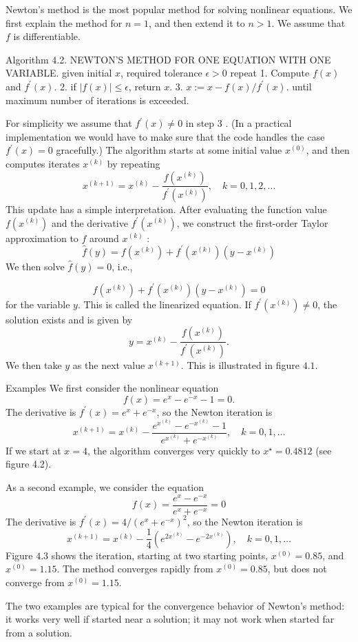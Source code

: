 Newton's method is the most popular method for solving nonlinear equations. We first explain the method for $ n=1 $, and then extend it to $ n>1 $. We assume that $ f $ is differentiable.

Algorithm 4.2. NEWTON'S METHOD FOR ONE EQUATION WITH ONE VARIABLE. given initial $ x $, required tolerance $ \epsilon>0 $ repeat
1. Compute $ f(x) $ and $ f^{\prime}(x) $.
2. if $ |f(x)| \leq \epsilon $, return $ x $.
3. $ x:=x-f(x) / f^{\prime}(x) $.
until maximum number of iterations is exceeded.

For simplicity we assume that $ f^{\prime}(x) \neq 0 $ in step 3 . (In a practical implementation we would have to make sure that the code handles the case $ f^{\prime}(x)=0 $ gracefully.)
The algorithm starts at some initial value $ x^{(0)} $, and then computes iterates $ x^{(k)} $ by repeating
$$
x^{(k+1)}=x^{(k)}-\frac{f\left(x^{(k)}\right)}{f^{\prime}\left(x^{(k)}\right)}, \quad k=0,1,2, \ldots
$$
This update has a simple interpretation. After evaluating the function value $ f\left(x^{(k)}\right) $ and the derivative $ f^{\prime}\left(x^{(k)}\right) $, we construct the first-order Taylor approximation to $ f $ around $ x^{(k)} $ :
$$
\hat{f}(y)=f\left(x^{(k)}\right)+f^{\prime}\left(x^{(k)}\right)\left(y-x^{(k)}\right)
$$
We then solve $ \hat{f}(y)=0 $, i.e.,

$$
f\left(x^{(k)}\right)+f^{\prime}\left(x^{(k)}\right)\left(y-x^{(k)}\right)=0
$$
for the variable $ y $. This is called the linearized equation. If $ f^{\prime}\left(x^{(k)}\right) \neq 0 $, the solution exists and is given by
$$
y=x^{(k)}-\frac{f\left(x^{(k)}\right)}{f^{\prime}\left(x^{(k)}\right)} .
$$
We then take $ y $ as the next value $ x^{(k+1)} $. This is illustrated in figure $ 4.1 $.

\begin{example}
    Examples We first consider the nonlinear equation
$$
f(x)=e^{x}-e^{-x}-1=0 .
$$
The derivative is $ f^{\prime}(x)=e^{x}+e^{-x} $, so the Newton iteration is
$$
x^{(k+1)}=x^{(k)}-\frac{e^{x^{(k)}}-e^{-x^{(k)}}-1}{e^{x^{(k)}}+e^{-x^{(k)}}}, \quad k=0,1, \ldots
$$
If we start at $ x=4 $, the algorithm converges very quickly to $ x^{\star}=0.4812 $ (see figure 4.2).
\end{example}

\begin{example}
    As a second example, we consider the equation
$$
f(x)=\frac{e^{x}-e^{-x}}{e^{x}+e^{-x}}=0
$$
The derivative is $ f^{\prime}(x)=4 /\left(e^{x}+e^{-x}\right)^{2} $, so the Newton iteration is
$$
x^{(k+1)}=x^{(k)}-\frac{1}{4}\left(e^{2 x^{(k)}}-e^{-2 x^{(k)}}\right), \quad k=0,1, \ldots
$$
Figure $ 4.3 $ shows the iteration, starting at two starting points, $ x^{(0)}=0.85 $, and $ x^{(0)}=1.15 $. The method converges rapidly from $ x^{(0)}=0.85 $, but does not converge from $ x^{(0)}=1.15 $.

The two examples are typical for the convergence behavior of Newton's method: it works very well if started near a solution; it may not work when started far from a solution.
\end{example}

